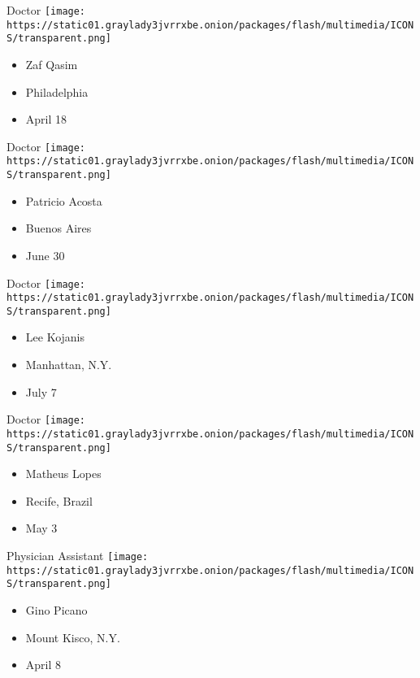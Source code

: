 \protect\hyperlink{item-zaf-qasim}{}

Doctor
\texttt{[image: https://static01.graylady3jvrrxbe.onion/packages/flash/multimedia/ICONS/transparent.png]}

\begin{itemize}
\tightlist
\item
  Zaf Qasim
\item
  Philadelphia
\item
  April 18
\end{itemize}

\protect\hyperlink{item-patricio-acosta}{}

Doctor
\texttt{[image: https://static01.graylady3jvrrxbe.onion/packages/flash/multimedia/ICONS/transparent.png]}

\begin{itemize}
\tightlist
\item
  Patricio Acosta
\item
  Buenos Aires
\item
  June 30
\end{itemize}

\protect\hyperlink{item-lee-kojanis}{}

Doctor
\texttt{[image: https://static01.graylady3jvrrxbe.onion/packages/flash/multimedia/ICONS/transparent.png]}

\begin{itemize}
\tightlist
\item
  Lee Kojanis
\item
  Manhattan, N.Y.
\item
  July 7
\end{itemize}

\protect\hyperlink{item-matheus-lopes}{}

Doctor
\texttt{[image: https://static01.graylady3jvrrxbe.onion/packages/flash/multimedia/ICONS/transparent.png]}

\begin{itemize}
\tightlist
\item
  Matheus Lopes
\item
  Recife, Brazil
\item
  May 3
\end{itemize}

\protect\hyperlink{item-gino-picano}{}

Physician Assistant
\texttt{[image: https://static01.graylady3jvrrxbe.onion/packages/flash/multimedia/ICONS/transparent.png]}

\begin{itemize}
\tightlist
\item
  Gino Picano
\item
  Mount Kisco, N.Y.
\item
  April 8
\end{itemize}


